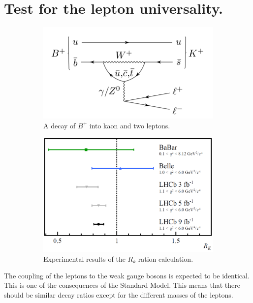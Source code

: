 \section{Test for the lepton universality.}

\begin{figure}
\begin{subfigure}[t]{0.5\textwidth}
  \centering
  \includegraphics[width=\linewidth]{figures/chapter1/BKLL.png}
  \caption{A decay of $B^{+}$ into kaon and two leptons.}
\end{subfigure}
\begin{subfigure}[t]{0.5\textwidth}
  \centering
  \includegraphics[width=\linewidth]{figures/chapter1/RK2021_s.png}
  \caption{Experimental results of the $R_{k}$ ration calculation.}
\end{subfigure}
 \caption[Experiments]{}
  \label{fig:bkll}
\end{figure}

The coupling of the leptons to the weak gauge bosons is expected to be identical. This is one of the consequences of the Standard Model.
This means that there should be similar decay ratios except for the different masses of the leptons.

